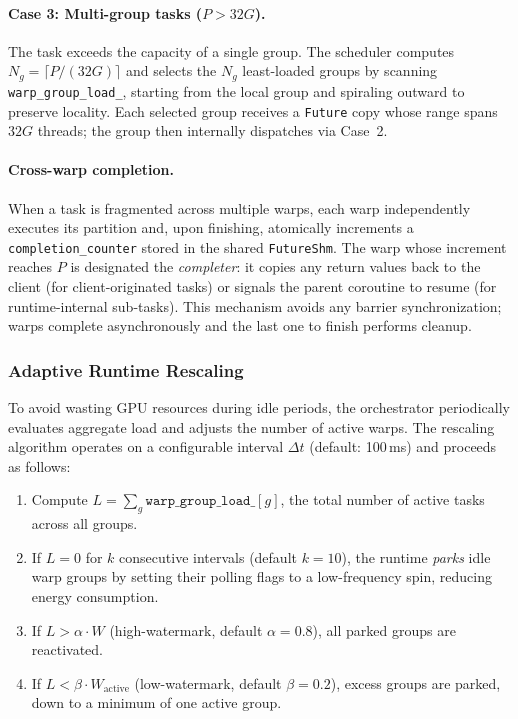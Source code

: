 \paragraph{Case 3: Multi-group tasks ($P > 32G$).}
The task exceeds the capacity of a single group.  The scheduler
computes $N_g = \lceil P/(32G) \rceil$ and selects the $N_g$
least-loaded groups by scanning \texttt{warp\_group\_load\_},
starting from the local group and spiraling outward to preserve
locality.  Each selected group receives a \texttt{Future} copy
whose range spans $32G$ threads; the group then internally
dispatches via Case~2.

\paragraph{Cross-warp completion.}
When a task is fragmented across multiple warps, each warp
independently executes its partition and, upon finishing,
atomically increments a \texttt{completion\_counter} stored in
the shared \texttt{FutureShm}.  The warp whose increment reaches
$P$ is designated the \emph{completer}: it copies any return
values back to the client (for client-originated tasks) or signals
the parent coroutine to resume (for runtime-internal sub-tasks).
This mechanism avoids any barrier synchronization; warps complete
asynchronously and the last one to finish performs cleanup.

\subsubsection{Adaptive Runtime Rescaling}
\label{sec:rescaling}

To avoid wasting GPU resources during idle periods, the orchestrator
periodically evaluates aggregate load and adjusts the number of
active warps.  The rescaling algorithm operates on a configurable
interval $\Delta t$ (default: 100\,ms) and proceeds as follows:

\begin{enumerate}[nosep]
  \item Compute $L = \sum_{g} \texttt{warp\_group\_load\_}[g]$,
    the total number of active tasks across all groups.
  \item If $L = 0$ for $k$ consecutive intervals (default $k=10$),
    the runtime \emph{parks} idle warp groups by setting their
    polling flags to a low-frequency spin, reducing energy
    consumption.
  \item If $L > \alpha \cdot W$ (high-watermark, default
    $\alpha = 0.8$), all parked groups are reactivated.
  \item If $L < \beta \cdot W_{\text{active}}$ (low-watermark,
    default $\beta = 0.2$), excess groups are parked, down to a
    minimum of one active group.
\end{enumerate}

